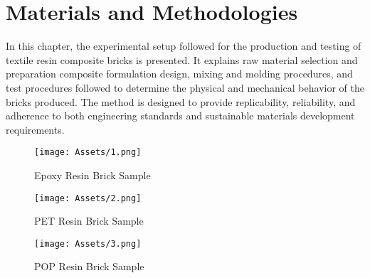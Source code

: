 \chapter{Materials and Methodologies }
In this chapter, the experimental setup followed for the production and testing of textile resin composite bricks is presented. It explains raw material selection and preparation composite formulation design, mixing and molding procedures, and test procedures followed to determine the physical and mechanical behavior of the bricks produced. The method is designed to provide replicability, reliability, and adherence to both engineering standards and sustainable materials development requirements. 
\vspace{12pt}
\begin{figure}[h]
    \centering
    \begin{minipage}{0.30\textwidth}
    \centering
    \texttt{[image: Assets/1.png]}
    \caption{Epoxy Resin Brick Sample }
    \label{fig:placeholder}
    \end{minipage}
    \hfill
    \begin{minipage}{0.30\textwidth}
    \centering
    \texttt{[image: Assets/2.png]}
    \caption{PET Resin Brick Sample }
    \label{fig:placeholder}
    \end{minipage}
    \hfill
    \begin{minipage}{0.30\textwidth}
    \centering
    \texttt{[image: Assets/3.png]}
    \caption{POP Resin Brick Sample }
    \label{fig:placeholder}
    \end{minipage}
\end{figure}




